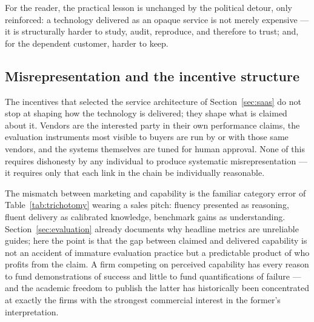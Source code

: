 \documentclass[11pt,a4paper]{article}
\begin{document}
For the reader, the practical lesson is unchanged by the political detour, only
reinforced: a technology delivered as an opaque service is not merely expensive
--- it is structurally harder to study, audit, reproduce, and therefore to
trust; and, for the dependent customer, harder to keep.

\subsection{Misrepresentation and the incentive structure}
\label{sec:incentives}

The incentives that selected the service architecture of
Section~\ref{sec:saas} do not stop at shaping how the technology is delivered;
they shape what is claimed about it. Vendors are the interested party in their
own performance claims, the evaluation instruments most visible to buyers are
run by or with those same vendors, and the systems themselves are tuned for
human approval. None of this requires dishonesty by any individual to produce
systematic misrepresentation --- it requires only that each link in the chain
be individually reasonable.

The mismatch between marketing and capability is the familiar category error
of Table~\ref{tab:trichotomy} wearing a sales pitch: fluency presented as
reasoning, fluent delivery as calibrated knowledge, benchmark gains as
understanding. Section~\ref{sec:evaluation} already documents why headline
metrics are unreliable guides; here the point is that the gap between claimed
and delivered capability is not an accident of immature evaluation practice
but a predictable product of who profits from the claim. A firm competing on
perceived capability has every reason to fund demonstrations of success and
little to fund quantifications of failure --- and the academic freedom to
publish the latter has historically been concentrated at exactly the firms
with the strongest commercial interest in the former's interpretation.
\end{document}
